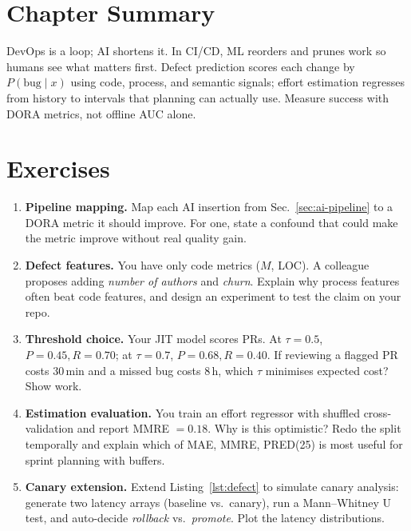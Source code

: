 \section{Chapter Summary}\label{sec:devops-summary}
DevOps is a loop; AI shortens it. In CI/CD, ML reorders and prunes work so humans see what matters first. Defect prediction scores each change by $P(\text{bug}\mid x)$ using code, process, and semantic signals; effort estimation regresses from history to intervals that planning can actually use. Measure success with DORA metrics, not offline AUC alone.

\section{Exercises}\label{sec:devops-ex}
\begin{enumerate}[label=E7.\arabic*, leftmargin=*, itemsep=0.75em]
  \item \textbf{Pipeline mapping.} Map each AI insertion from Sec.~\ref{sec:ai-pipeline} to a DORA metric it should improve. For one, state a confound that could make the metric improve without real quality gain.
  \item \textbf{Defect features.} You have only code metrics ($M$, LOC). A colleague proposes adding \emph{number of authors} and \emph{churn}. Explain why process features often beat code features, and design an experiment to test the claim on your repo.
  \item \textbf{Threshold choice.} Your JIT model scores PRs. At $\tau=0.5$, $P=0.45,R=0.70$; at $\tau=0.7$, $P=0.68,R=0.40$. If reviewing a flagged PR costs 30\,min and a missed bug costs 8\,h, which $\tau$ minimises expected cost? Show work.
  \item \textbf{Estimation evaluation.} You train an effort regressor with shuffled cross-validation and report MMRE $=0.18$. Why is this optimistic? Redo the split temporally and explain which of MAE, MMRE, PRED(25) is most useful for sprint planning with buffers.
  \item \textbf{Canary extension.} Extend Listing~\ref{lst:defect} to simulate canary analysis: generate two latency arrays (baseline vs.\ canary), run a Mann--Whitney U test, and auto-decide \emph{rollback} vs.\ \emph{promote}. Plot the latency distributions.
\end{enumerate}
